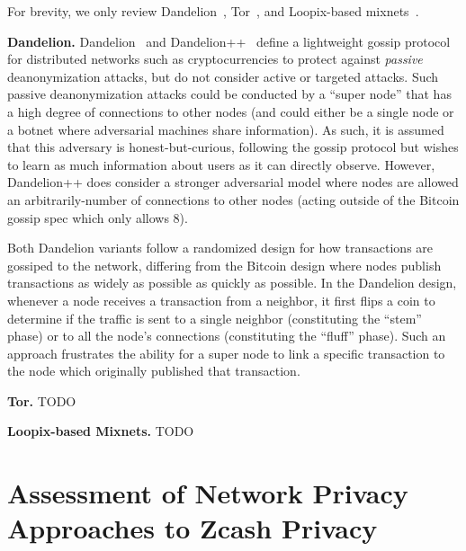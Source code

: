 \documentclass{article}
\begin{document}
For brevity, we only review
Dandelion~\cite{Fanti:2018:DLC,BojjaVenkatakrishnan:2017:DRB},
Tor~\cite{tor-specification}, and
Loopix-based mixnets~\cite{Piotrowska:2017:LAS}.

\textbf{Dandelion.}
Dandelion~\cite{BojjaVenkatakrishnan:2017:DRB} and
Dandelion++~\cite{Fanti:2018:DLC} define a lightweight gossip protocol for
distributed networks such as cryptocurrencies to protect against \emph{passive}
deanonymization attacks, but do not consider active or targeted attacks. Such
passive deanonymization attacks could be conducted by a ``super node'' that has
a high degree of connections to other nodes (and could either be a single node
or a botnet where adversarial machines share information). As such, it is
assumed that this adversary is honest-but-curious, following the gossip protocol
but wishes to learn as much information about users as it can directly observe.
However, Dandelion++ does consider a stronger adversarial model where nodes are
allowed an arbitrarily-number of connections to other nodes (acting outside of the
Bitcoin gossip spec which only allows 8).

Both Dandelion variants follow a randomized design for how transactions are
gossiped to the network, differing from the Bitcoin design where nodes publish
transactions as widely as possible as quickly as possible. In the Dandelion
design, whenever a node receives a transaction from a neighbor, it
first flips a coin to determine if the traffic is sent to a single
neighbor (constituting the ``stem'' phase) or to all the node's connections
(constituting the ``fluff'' phase). Such an approach frustrates the ability for
a super node to link a specific transaction to the node which originally
published that transaction.


\textbf{Tor.}
TODO

\textbf{Loopix-based Mixnets.}
TODO

\section{Assessment of Network Privacy Approaches to Zcash Privacy}
\label{network-privacy-assessment}





\end{document}

